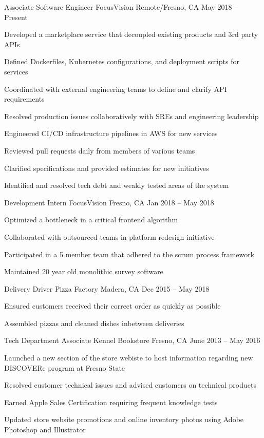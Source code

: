 \documentclass[]{awesome-cv}
\begin{document}
\vspace{-2mm}
\begin{cventries}
	\cventry
	{Associate Software Engineer}
	{FocusVision}
	{Remote/Fresno, CA}
	{May 2018 – Present}
	{\begin{cvitems}
		\item {Developed a marketplace service that decoupled existing products and 3rd party APIs}
		\item {Defined Dockerfiles, Kubernetes configurations, and deployment scripts for services}
		\item {Coordinated with external engineering teams to define and clarify API requirements}
		\item {Resolved production issues collaboratively with SREs and engineering leadership}
		\item {Engineered CI/CD infrastructure pipelines in AWS for new services}
		\item {Reviewed pull requests daily from members of various teams}
		\item {Clarified specifications and provided estimates for new initiatives}
		\item {Identified and resolved tech debt and weakly tested areas of the system}
		\end{cvitems}}
	\cventry
	{Development Intern}
	{FocusVision}
	{Fresno, CA}
	{Jan 2018 – May 2018}
	{\begin{cvitems}
		\item {Optimized a bottleneck in a critical frontend algorithm}
		\item {Collaborated with outsourced teams in platform redesign initiative}
		\item {Participated in a 5 member team that adhered to the scrum process framework}
		\item {Maintained 20 year old monolithic survey software}
		\end{cvitems}}
	\cventry
	{Delivery Driver}
	{Pizza Factory}
	{Madera, CA}
	{Dec 2015 – May 2018}
	{\begin{cvitems}
		\item {Ensured customers received their correct order as quickly as possible}
		\item {Assembled pizzas and cleaned dishes inbetween deliveries}
		\end{cvitems}}
	\cventry
	{Tech Department Associate}
	{Kennel Bookstore}
	{Fresno, CA}
	{June 2013 – May 2016}
	{\begin{cvitems}
		\item {Launched a new section of the store webiste to host information regarding new DISCOVERe program at Fresno State}
		\item {Resolved customer technical issues and advised customers on technical products}
		\item {Earned Apple Sales Certification requiring frequent knowledge tests}
		\item {Updated store website promotions and online inventory photos using Adobe Photoshop and Illustrator}
		\end{cvitems}}
\end{cventries}
\end{document}
